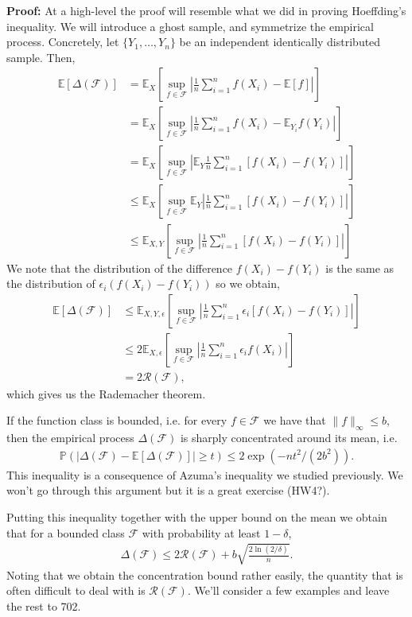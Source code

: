 \documentclass[twoside,12pt]{article}
\begin{document}
{\bf Proof: } At a high-level the proof will resemble what we did in proving Hoeffding's inequality. We will introduce a ghost sample, and symmetrize the empirical process. Concretely, let $\{Y_1,\ldots,Y_n\}$ be an independent identically distributed sample. Then,
\begin{align*}
\mathbb{E}[\Delta(\mathcal{F})] &= \mathbb{E}_X\left[ \sup_{f \in \mathcal{F}} \left| \frac{1}{n} \sum_{i=1}^n f(X_i) - \mathbb{E}[f] \right|\right] \\
&=  \mathbb{E}_X\left[ \sup_{f \in \mathcal{F}} \left| \frac{1}{n} \sum_{i=1}^n f(X_i) - \mathbb{E}_{Y_i} f(Y_i) \right|\right] \\
&= \mathbb{E}_X\left[ \sup_{f \in \mathcal{F}} \left| \mathbb{E}_Y \frac{1}{n} \sum_{i=1}^n [f(X_i) -  f(Y_i)] \right|\right] \\
&\leq  \mathbb{E}_X\left[ \sup_{f \in \mathcal{F}} \mathbb{E}_Y  \left| \frac{1}{n} \sum_{i=1}^n [f(X_i) -  f(Y_i)] \right|\right] \\
&\leq \mathbb{E}_{X,Y} \left[ \sup_{f \in \mathcal{F}}   \left| \frac{1}{n} \sum_{i=1}^n [f(X_i) -  f(Y_i)] \right|\right]
\end{align*}
We note that the distribution of the difference $f(X_i) - f(Y_i)$ is the same as the distribution of $\epsilon_i (f(X_i) - f(Y_i))$ so we obtain, 
\begin{align*}
\mathbb{E}[\Delta(\mathcal{F})] &\leq  \mathbb{E}_{X,Y,\epsilon} \left[ \sup_{f \in \mathcal{F}}   \left| \frac{1}{n} \sum_{i=1}^n \epsilon_i [f(X_i) -  f(Y_i)] \right|\right] \\
&\leq  2 \mathbb{E}_{X,\epsilon} \left[ \sup_{f \in \mathcal{F}}   \left| \frac{1}{n} \sum_{i=1}^n \epsilon_i f(X_i) \right|\right] \\
&= 2 \mathcal{R}(\mathcal{F}),
\end{align*}
which gives us the Rademacher theorem.

If the function class is bounded, i.e. for every $f \in \mathcal{F}$ we have that $\|f\|_{\infty} \leq b$, then the empirical process $\Delta(\mathcal{F})$ is sharply concentrated around its mean, i.e.
\begin{align*}
\mathbb{P}( |\Delta(\mathcal{F}) - \mathbb{E}[\Delta(\mathcal{F})]| \geq t) \leq 2 \exp( -nt^2/(2b^2)).
\end{align*}
This inequality is a consequence of Azuma's inequality we studied previously. We won't go through this argument but it is a great exercise (HW4?). 


Putting this inequality together with the upper bound on the mean we obtain that for a bounded class $\mathcal{F}$ with probability at least $1 - \delta$,
\begin{align*}
\Delta(\mathcal{F}) \leq 2\mathcal{R}(\mathcal{F}) + b \sqrt{ \frac{2 \ln(2/\delta)}{n}}. 
\end{align*}
Noting that we obtain the concentration bound rather easily, the quantity that is often difficult to deal with is $\mathcal{R}(\mathcal{F}).$ We'll consider a few examples and leave the rest to 702.
\end{document}
